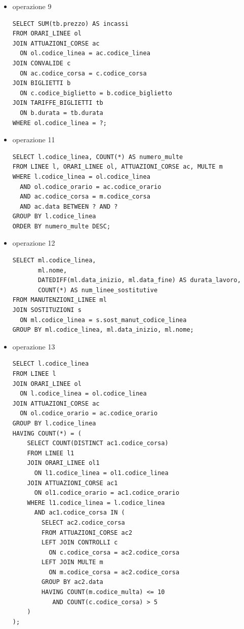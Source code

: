 \documentclass[12pt,a4paper]{report}
\begin{document}
\begin{itemize}
\item operazione 9
\begin{lstlisting}[style=sqlstyle, caption=Query for Total Revenue (Incassi) by Linea]
SELECT SUM(tb.prezzo) AS incassi
FROM ORARI_LINEE ol
JOIN ATTUAZIONI_CORSE ac
  ON ol.codice_linea = ac.codice_linea
JOIN CONVALIDE c
  ON ac.codice_corsa = c.codice_corsa
JOIN BIGLIETTI b
  ON c.codice_biglietto = b.codice_biglietto
JOIN TARIFFE_BIGLIETTI tb
  ON b.durata = tb.durata
WHERE ol.codice_linea = ?;
\end{lstlisting}

\item operazione 11
\begin{lstlisting}[style=sqlstyle, caption=Query for Number of Fines per Linea Between Two Dates]
SELECT l.codice_linea, COUNT(*) AS numero_multe
FROM LINEE l, ORARI_LINEE ol, ATTUAZIONI_CORSE ac, MULTE m
WHERE l.codice_linea = ol.codice_linea
  AND ol.codice_orario = ac.codice_orario
  AND ac.codice_corsa = m.codice_corsa
  AND ac.data BETWEEN ? AND ?
GROUP BY l.codice_linea
ORDER BY numero_multe DESC;
\end{lstlisting}

\item operazione 12
\begin{lstlisting}[style=sqlstyle, caption=Query for Duration of Maintenance and Substitute Lines Count]
SELECT ml.codice_linea,
       ml.nome,
       DATEDIFF(ml.data_inizio, ml.data_fine) AS durata_lavoro,
       COUNT(*) AS num_linee_sostitutive
FROM MANUTENZIONI_LINEE ml
JOIN SOSTITUZIONI s
  ON ml.codice_linea = s.sost_manut_codice_linea
GROUP BY ml.codice_linea, ml.data_inizio, ml.nome;
\end{lstlisting}

\item operazione 13
\begin{lstlisting}[style=sqlstyle, caption=Query to Find Lines Matching Fine/Control Conditions on All Trips]
SELECT l.codice_linea
FROM LINEE l
JOIN ORARI_LINEE ol
  ON l.codice_linea = ol.codice_linea
JOIN ATTUAZIONI_CORSE ac
  ON ol.codice_orario = ac.codice_orario
GROUP BY l.codice_linea
HAVING COUNT(*) = (
    SELECT COUNT(DISTINCT ac1.codice_corsa)
    FROM LINEE l1
    JOIN ORARI_LINEE ol1
      ON l1.codice_linea = ol1.codice_linea
    JOIN ATTUAZIONI_CORSE ac1
      ON ol1.codice_orario = ac1.codice_orario
    WHERE l1.codice_linea = l.codice_linea
      AND ac1.codice_corsa IN (
        SELECT ac2.codice_corsa
        FROM ATTUAZIONI_CORSE ac2
        LEFT JOIN CONTROLLI c
          ON c.codice_corsa = ac2.codice_corsa
        LEFT JOIN MULTE m
          ON m.codice_corsa = ac2.codice_corsa
        GROUP BY ac2.data
        HAVING COUNT(m.codice_multa) <= 10
           AND COUNT(c.codice_corsa) > 5
    )
);
\end{lstlisting}


\end{itemize}
\end{document}

